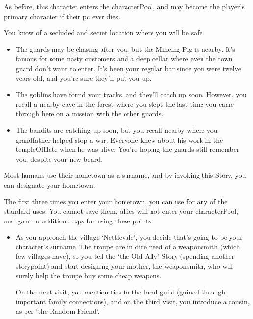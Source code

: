 \begin{multicols}{2}
As before, this character enters the \gls{characterPool}, and may become the player's primary character if their \gls{pc} ever dies.

You know of a secluded and secret location where you will be safe.

\begin{itemize}
  \item
  The guards may be chasing after you, but the Mincing Pig is nearby.  It's famous for some nasty customers and a deep cellar where even the town guard don't want to enter.
  It's been your regular bar since you were twelve years old, and you're sure they'll put you up.
  \item
  The goblins have found your tracks, and they'll catch up soon.
  However, you recall a nearby cave in the forest where you slept the last time you came through here on a mission with the other guards.
  \item
  The bandits are catching up soon, but you recall  nearby where you grandfather helped stop a war.
  Everyone knew about his work in the \gls{templeOfHate} when he was alive.
  You're hoping the guards still remember you, despite your new beard.
\end{itemize}

Most humans use their hometown as a surname, and by invoking this Story, you can designate your hometown.

The first three times you enter your hometown, you can use  for any of the standard uses.
You cannot save them, allies will not enter your \gls{characterPool}, and gain no additional \glspl{xp} for using these points.

\begin{itemize}
  \item
  As you approach the \gls{village} `Nettlevale', you decide that's going to be your character's surname.
  The troupe are in dire need of a weaponsmith (which few \glspl{village} have), so you tell the `the Old Ally' Story (spending another \gls{storypoint}) and start designing your mother, the weaponsmith, who will surely help the troupe buy some cheap weapons.

  On the next visit, you mention ties to the local guild (gained through important family connections), and on the third visit, you introduce a cousin, as per `the Random Friend'.
\end{itemize}

\end{multicols}
